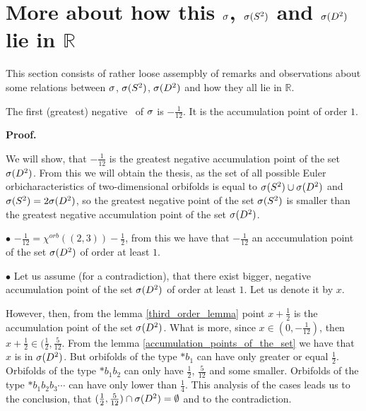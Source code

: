 


\section{More about how this ${\sigma}$, ${{\sigma}(S^2)}$ and ${{\sigma}(D^2)}$ lie in $\mathbb{R}$}
This section consists of rather loose assempbly of remarks and observations about some 
relations between ${\sigma}$, ${{\sigma}(S^2)}$, ${{\sigma}(D^2)}$ and how they all lie in $\mathbb{R}$.
\begin{observation}
The first (greatest) negative \apots\ of ${\sigma}$ is 
$-\frac{1}{12}$. It is the accumulation point of order $1$. 
\end{observation}
\noindent\textbf{Proof.} 

We will show, that $-\frac{1}{12}$ is the greatest negative accumulation point of the set ${{\sigma}(D^2)}$. 
From this we will obtain the thesis, as the set of all possible Euler orbicharacteristics 
of two-dimensional orbifolds is equal to ${{\sigma}(S^2)} \cup {{\sigma}(D^2)}$ and ${{\sigma}(S^2)} = 2{{\sigma}(D^2)}$, so 
the greatest negative point of the set ${{\sigma}(S^2)}$ is smaller than the greatest negative accumulation 
point of the set ${{\sigma}(D^2)}$. 

$\bullet$ $-\frac{1}{12}=\chi^{orb}((2,3))-\frac{1}{2}$, from this we have that $-\frac{1}{12}$ 
an acccumulation point of the set ${{\sigma}(D^2)}$ of order at least $1$. 

$\bullet$ Let us assume (for a contradiction), that there exist bigger, negative 
accumulation point of the set ${{\sigma}(D^2)}$ of order at least $1$. Let us denote it by $x$. 

However, then, from the lemma \ref{third_order_lemma} point $x+\frac{1}{2}$ is the accumulation 
point of the set ${{\sigma}(D^2)}$. What is more, since $x\in (0, -\frac{1}{12})$, then $x+\frac{1}{2} 
\in (\frac{1}{2}, \frac{5}{12}$. From the lemma \ref{accumulation_points_of_the_set} we 
have that $x$ is in ${{\sigma}(D^2)}$. But orbifolds of the type $\ast b_1$ can have \Eoc only greater or 
equal $\frac{1}{2}$. Orbifolds of the type $\ast b_1b_2$ can only have \Eoc $\frac{1}{2}$, 
$\frac{5}{12}$ and some smaller. Orbifolds of the type $\ast b_1b_2b_3\cdots$ can have \Eoc only 
lower than $\frac{1}{4}$. This analysis of the cases leads us to the conclusion, that 
$(\frac{1}{2},\frac{5}{12})\cap {{\sigma}(D^2)}=\emptyset$ and to the contradiction. 

